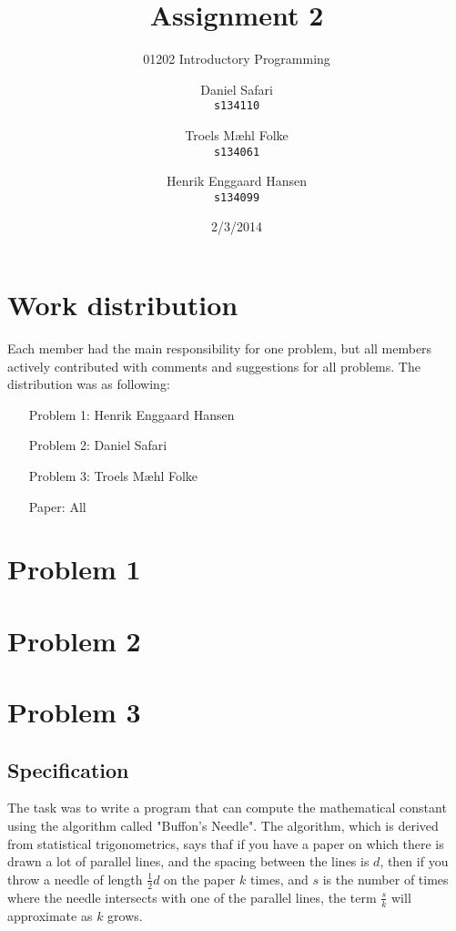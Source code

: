 \documentclass{scrartcl}
\begin{document}

\title{Assignment 2}
\subtitle{01202 Introductory Programming}
\author{
  Daniel Safari\\
  \texttt{s134110}
  \and
  Troels Mæhl Folke\\
  \texttt{s134061}
   \and
  Henrik Enggaard Hansen\\
  \texttt{s134099}
}
\date{2/3/2014}
\maketitle
\thispagestyle{empty}
\setcounter{page}{0}
\null
\vfill
\section*{Work distribution}

Each member had the main responsibility for one problem, but all members
actively contributed with comments and suggestions for all problems. The
distribution was as following:
\begin{itemize}
\setlength{\itemindent}{3em}
\item[Problem 1:] Henrik Enggaard Hansen
\item[Problem 2:] Daniel Safari
\item[Problem 3:] Troels Mæhl Folke
\item[Paper:]  All
\end{itemize}
\newpage
\section*{Problem 1}



\section*{Problem 2}



\section*{Problem 3}
\subsection*{Specification}
The task was to write a program that can compute the mathematical 
constant \pi using the algorithm called "Buffon's Needle".
The algorithm, which is derived from statistical trigonometrics, says
thaf if you have a paper on which there is drawn a lot of parallel
lines, and the spacing between the lines is $d$, then if you throw
a needle of length $\frac{1}{2}d$ on the paper $k$ times, and $s$
is the number of times where the needle intersects with one
of the parallel lines, the term $\frac{s}{k}$ will approximate \pi
as $k$ grows.
\end{document}
